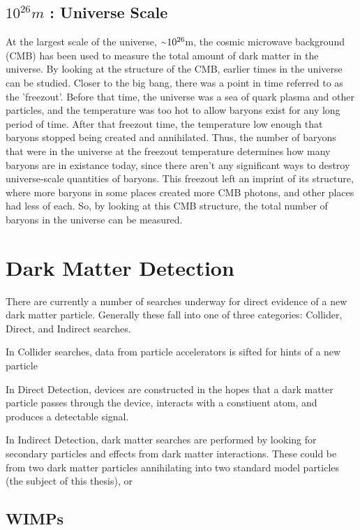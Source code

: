 \subsection{$10^{26}m$ : Universe Scale}
%
At the largest scale of the universe, $\nicetilde 10^{26}$m, the cosmic microwave background (CMB) has been used to measure the total amount of dark matter in the universe.
By looking at the structure of the CMB, earlier times in the universe can be studied.
Closer to the big bang, there was a point in time referred to as the 'freezout'.
Before that time, the universe was a sea of quark plasma and other particles, and the temperature was too hot to allow baryons exist for any long period of time.
After that freezout time, the temperature low enough that baryons stopped being created and annihilated.
Thus, the number of baryons that were in the universe at the freezout temperature determines how many baryons are in existance today, since there aren't any significant ways to destroy universe-scale quantities of baryons.
This freezout left an imprint of its structure, where more baryons in some places created more CMB photons, and other places had less of each.
So, by looking at this CMB structure, the total number of baryons in the universe can be measured.

\section{Dark Matter Detection}

There are currently a number of searches underway for direct evidence of a new dark matter particle.
Generally these fall into one of three categories: Collider, Direct, and Indirect searches.

In Collider searches, data from particle accelerators is sifted for hints of a new particle

In Direct Detection, devices are constructed in the hopes that a dark matter particle passes through the device, interacts with a constiuent atom, and produces a detectable signal.

In Indirect Detection, dark matter searches are performed by looking for secondary particles and effects from dark matter interactions.
These could be from two dark matter particles annihilating into two standard model particles (the subject of this thesis), or 





\subsection{WIMPs}

